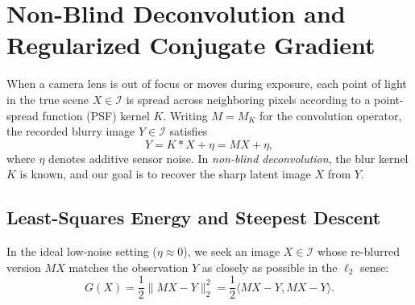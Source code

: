 \documentclass{amsart}
\begin{document}
\section{Non-Blind Deconvolution and Regularized Conjugate Gradient}\label{sec_deconv}

When a camera lens is out of focus or moves during exposure, each point of light in the true scene $X \in \mathcal{I}$ is spread across neighboring pixels according to a point-spread function (PSF) kernel $K$. Writing $M = M_K$ for the convolution operator, the recorded blurry image $Y \in \mathcal{I}$ satisfies
\begin{equation}\label{eq_blur_model}
    Y = K * X + \eta = M X + \eta,
\end{equation}
where $\eta$ denotes additive sensor noise. In \emph{non-blind deconvolution}, the blur kernel $K$ is known, and our goal is to recover the sharp latent image $X$ from $Y$.

\subsection{Least-Squares Energy and Steepest Descent}
In the ideal low-noise setting ($\eta \approx 0$), we seek an image $X \in \mathcal{I}$ whose re-blurred version $M X$ matches the observation $Y$ as closely as possible in the $\ell_2$ sense:
\begin{equation}\label{eq_deconv_energy}
    G(X) = \frac{1}{2}\|M X - Y\|_2^2 = \frac{1}{2}\langle M X - Y, M X - Y \rangle.
\end{equation}
\end{document}
